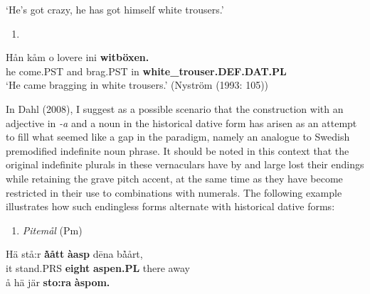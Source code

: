 ‘He’s got crazy, he has got himself white trousers.’
\z


\begin{enumerate} %
\item 
\end{enumerate} %
\ea\label{}
\gll Hån  kåm  o  lovere  ini  \textbf{witböxen.}\\


he  come.PST  and  brag.PST  in  \textbf{white\_trouser.DEF.DAT.PL}\\ %


‘He came bragging in white trousers.’ (Nyström (1993: 105))
\z

In Dahl (2008), I suggest as a possible scenario that the construction with an adjective in\textit{ {}-a} and a noun in the historical dative form has arisen as an attempt to fill what seemed like a gap in the paradigm, namely an analogue to Swedish premodified indefinite noun phrase. It should be noted in this context that the original indefinite plurals in these vernaculars have by and large lost their endings while retaining the grave pitch accent, at the same time as they have become restricted in their use to combinations with numerals. The following example illustrates how such endingless forms alternate with historical dative forms: 

\begin{enumerate} %
\item 
\textit{Pitemål} (Pm)
\end{enumerate} %
\ea\label{}
\gll Hä  stå:r  \textbf{\`{å}ått} \textbf{àasp} d\=ena  b\`{å}årt,\\


it  stand.PRS  \textbf{eight} \textbf{aspen.PL} there  away\\ %


\ea\label{}
\gll å  hä  jär  \textbf{sto:ra} \textbf{àspom.}\\



